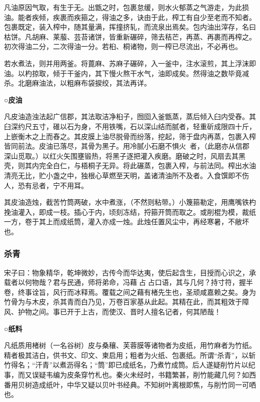 \documentclass[]{article}
\begin{document}
凡油原因气取，有生于无。出甑之时，包裹怠缓，则水火郁蒸之气游走，为此损油。能者疾倾，疾裹而疾箍之，得油之多，诀由于此，榨工有自少至老而不知者。包裹既定，装入榨中，随其量满，挥撞挤轧，而流泉出焉矣。包内油出滓存，名曰枯饼。凡胡麻、莱菔、芸苔诸饼，皆重新碾碎，筛去秸芒，再蒸、再裹而再榨之。初次得油二分，二次得油一分。若桕、桐诸物，则一榨已尽流出，不必再也。

若水煮法，则并用两釜。将蓖麻、苏麻子碾碎，入一釜中，注水滚煎，其上浮沫即油。以杓掠取，倾于干釜内，其下慢火熬干水气，油即成矣。然得油之数毕竟减杀。北磨麻油法，以粗麻布袋捩绞，其法再详。

\textbf{○皮油}

凡皮油造浊法起广信郡，其法取洁净桕子，囫囵入釜甑蒸，蒸后倾入臼内受舂。其臼深约尺五寸，碓以石为身，不用铁嘴，石以深山结而腻者，轻重斫成限四十斤，上嵌衡木之上而舂之。其皮膜上油尽脱骨而纷落，挖起，筛于盘内再蒸，包裹入榨皆同前法。皮油已落尽，其骨为黑子。用冷腻小石磨不惧火者，（此磨亦从信郡深山觅取。）以红火矢围壅锻热，将黑子逐把灌入疾磨。磨破之时，风扇去其黑壳，则其内完全白仁，与梧桐子无异。将此碾蒸，包裹入榨，与前法同。榨出水油清亮无比，贮小盏之中，独根心草燃至天明，盖诸清油所不及者。入食馔即不伤人，恐有忌者，宁不用耳。

其皮油造烛，截苦竹筒两破，水中煮涨，（不然则粘带。）小篾箍勒定，用鹰嘴铁杓挽油灌入，即成一枝。插心于内，顷刻冻结，捋箍开筒而取之。或削棍为模，裁纸一方，卷于其上而成纸筒，灌入亦成一烛。此烛任置风尘中，再经寒暑，不敝坏也。

\hypertarget{header-n2638}{%
\subsubsection{杀青}\label{header-n2638}}

宋子曰：物象精华，乾坤微妙，古传今而华达夷，使后起含生，目授而心识之，承载者以何物哉？君与民通，师将弟命，冯藉占占口语，其与几何？持寸符，握半卷，终事诠旨，风行而冰释焉。覆载之间之藉有楮先生也，圣顽咸嘉赖之矣。身为竹骨为与木皮，杀其青而白乃见，万卷百家基从此起。其精在此，而其粗效于障风、护物之间。事已开于上古，而使汉、晋时人擅名记者，何其陋哉！

\textbf{○纸料}

凡纸质用楮树（一名谷树）皮与桑穰、芙蓉膜等诸物者为皮纸，用竹麻者为竹纸。精者极其洁白，供书文、印文、柬启用；粗者为火纸、包裹纸。所谓``杀青''，以斩竹得名；``汗青''以煮沥得名；``筒''即已成纸名，乃煮竹成筒。后人遂疑削竹片以纪事，而又误疑韦编为皮条穿竹札也。秦火未经时，书籍繁甚，削竹能藏几何？如西番用贝树造成纸叶，中华又疑以贝叶书经典。不知树叶离根即焦，与削竹同一可哂也。
\end{document}
